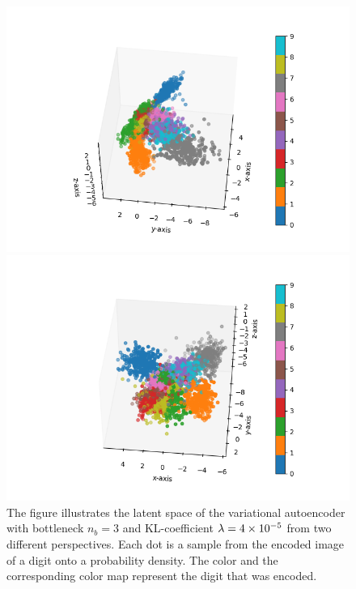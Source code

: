 \begin{figure}
\begin{center}
   \begin{minipage}[b]{0.49\linewidth}
      \includegraphics[trim = 20mm 10mm 20mm 10mm, clip, width=\linewidth]{convolutional_VAE_snd_KL_4e-5_10k_epochs_3D_latent_1}
	\end{minipage}
   \begin{minipage}[b]{0.49\linewidth}
      \includegraphics[trim = 20mm 10mm 20mm 10mm, clip, width=\linewidth]{convolutional_VAE_snd_KL_4e-5_10k_epochs_3D_latent_2}
	\end{minipage}
\end{center}
\caption{The figure illustrates the latent space of the variational autoencoder with bottleneck $n_b=3$ and KL-coefficient $\lambda = \num{4e-5}$ from two different perspectives. Each dot is a sample from the encoded image of a digit onto a probability density. The color and the corresponding color map represent the digit that was encoded.}\label{fig:convolutional_VAE_snd_KL_4e-5_10k_epochs_3D_latent}
\end{figure}


